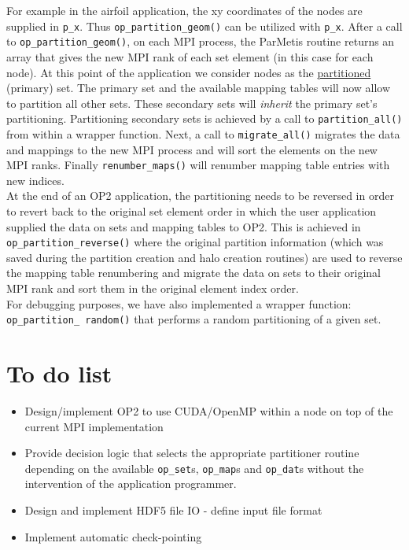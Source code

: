 \documentclass[11pt]{article}
\begin{document}
\indent For example in the airfoil application, the xy coordinates of the nodes are supplied in \texttt{p\_x}. Thus
\texttt{op\_partition\_geom()} can be utilized with \texttt{p\_x}. After a call to \texttt{op\_partition\_geom()}, on
each MPI process, the ParMetis routine returns an array that gives the new MPI rank of each set element (in this case
for each node). At this point of the application we consider nodes as the \underline{partitioned} (primary) set. The
primary set and the available mapping tables will now allow to partition all other sets. These secondary sets will
\textit{inherit} the primary set's partitioning. Partitioning secondary sets is achieved by a call to
\texttt{partition\_all()} from within a wrapper function. Next, a call to \texttt{migrate\_all()} migrates the data and
mappings to the new MPI process and will sort the elements on the new MPI ranks.  Finally \texttt{renumber\_maps()}
will renumber mapping table entries with new indices. \\
\indent At the end of an OP2 application, the partitioning needs to be reversed in order to revert back to the original
set element order in which the user application supplied the data on sets and mapping tables to OP2. This is achieved in
\texttt{op\_partition\_reverse()} where the original partition information (which was saved during the partition
creation and halo creation routines) are used to reverse the mapping table renumbering and migrate the data on sets to
their original MPI rank and sort them in the original element index order. \\

\noindent For debugging purposes, we have also implemented a wrapper function: \texttt{op\_partition\_ random()} that
performs a random partitioning of a given set.


\section{To do list}
\begin{itemize}
\item Design/implement OP2 to use CUDA/OpenMP within a node on top of the current MPI implementation
\item Provide decision logic that selects the appropriate partitioner routine depending on the available
\texttt{op\_set}s, \texttt{op\_map}s and \texttt{op\_dat}s without the intervention of the application programmer.
\item Design and implement HDF5 file IO - define input file format
\item Implement automatic check-pointing
\end{itemize}
\end{document}
